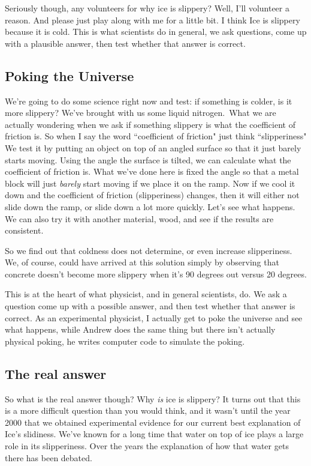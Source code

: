 \documentclass[12pt]{article}
\begin{document}
Seriously
though, any volunteers for why ice is slippery? Well, I'll volunteer a reason. And please 
just play along with me for a little bit. I think Ice is slippery because it is cold.
This is what scientists do in general, we ask questions, come up with a plausible answer, 
then test whether that answer is correct. 

\subsection{Poking the Universe}
We're going to do some science right now 
and test: if something is colder, is it more slippery? We've brought with us some 
liquid nitrogen. What we are actually wondering when we ask if something slippery
is what the coefficient of friction is. So when I say the word ``coefficient of
friction" just think ``slipperiness" We test it by putting an object on
top of an angled surface so that it just barely starts moving. Using the angle 
the surface is tilted, we can calculate what the coefficient of friction is. 
What we've done here is fixed the angle so that a metal block will just \emph{barely}
start moving if we place it on the ramp. Now if we cool it down and the coefficient
of friction (slipperiness) changes, then it will either not slide down the ramp, or
slide down a lot more quickly. Let's see what happens. 
We can also try it with another material, wood, and see if the results are 
consistent. 

So we find out that coldness does not determine, or even increase slipperiness.
We, of course, could have arrived at this solution simply by observing that
concrete doesn't become more slippery when it's 90 degrees out versus 20 degrees. 

This is at the heart of what physicist, and in general scientists, do. We ask 
a question come up with a possible answer, and then test whether that answer is
correct. As an experimental physicist, I actually get to poke the universe and
see what happens, while Andrew does the same thing but there isn't actually 
physical poking, he writes computer code to simulate the poking. 

\subsection{The real answer}
So what is the real answer though? Why \emph{is} ice is slippery? 
It turns out that this is a more difficult question than you would think, and
it wasn't until the year 2000 that we obtained experimental evidence for our 
current best explanation of Ice's slidiness. We've known for a long time
that water on top of ice plays a large role in its slipperiness. Over the years
the explanation of how that water gets there has been debated. 
\end{document}
